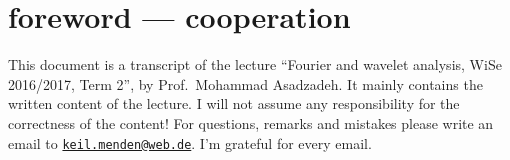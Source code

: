 
\newcommand{\Semester}{WiSe 2016/2017, Term 2}
\newcommand{\fach}{Fourier and wavelet analysis}
\newcommand{\prof}{Prof.\ Mohammad Asadzadeh}






\maketitle
\cleardoubleoddemptypage

\section*{foreword --- cooperation}
This document is a transcript of the lecture \enquote{\fach, \Semester}, by \prof.
It mainly contains the written content of the lecture. I will not assume any responsibility for the correctness of the content! For questions, remarks and mistakes please write an email to \href{mailto:keil.menden@web.de}{\nolinkurl{keil.menden@web.de}}. I'm grateful for every email. 
\newpage

\newpage

\tableofcontents
\cleardoubleoddemptypage
{}
\setcounter{page}{1}

